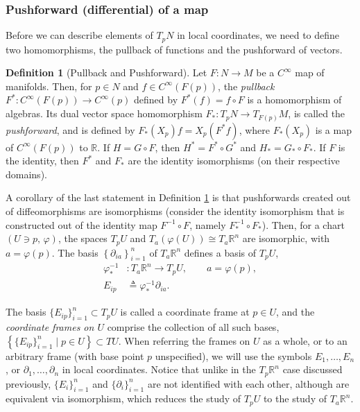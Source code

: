 \documentclass[psamsfonts]{amsart}
\theoremstyle{definition}
\newtheorem{defn}[thm]{Definition}
\theoremstyle{remark}
\newcommand*\R{\mathds{R}}
\numberwithin{equation}{section}
\begin{document}
\subsubsection{Pushforward (differential) of a map}
Before we can describe elements of $T_pN$ in local coordinates, we need to define two homomorphisms, the pullback of functions and the pushforward of vectors. 

\begin{defn}[Pullback and Pushforward]\label{def:pushforward}
Let $F:N\rightarrow M$ be a $C^{\infty}$ map of manifolds. Then, for $p\in N$ and $f\in C^{\infty}(F(p))$, the \textit{pullback} $F^*:C^{\infty}(F(p))\rightarrow C^{\infty}(p)$ defined by $F^*(f) = f\circ F$ is a homomorphism of algebras. Its dual vector space homomorphism $F_*:T_pN \rightarrow T_{F(p)}M$, is called the \textit{pushforward}, and is defined by $F_*(X_p)f = X_p(F^*f)$, where $F_*(X_p)$ is a map of $C^{\infty}(F(p))$ to $\R$. If $H = G\circ F$, then $H^* = F^* \circ G^*$ and $H_* = G_* \circ F_*$. If $F$ is the identity, then $F^*$ and $F_*$ are the identity isomorphisms (on their respective domains). 
\end{defn}

A corollary of the last statement in Definition \ref{def:pushforward} is that pushforwards created out of diffeomorphisms are isomorphisms (consider the identity isomorphism that is constructed out of the identity map $F^{-1}\circ F$, namely $F_*^{-1}\circ F_*$). Then, for a chart $(U\ni p,\, \varphi)$, the spaces $T_pU$ and $T_{a}\left(\varphi(U)\right) \cong T_{a}\R^n$ are isomorphic, with $a = \varphi(p)$. The basis $ \left\{\partial_{ia}\right\}_{i = 1}^n$ of $T_{a}\R^n$ defines a basis of $T_pU$, 
\begin{equation}
\begin{aligned}
\varphi^{-1}_*&:T_{a}\R^n\rightarrow T_pU, \qquad a = \varphi(p),\\
E_{ip} &\triangleq{} \varphi^{-1}_*\partial_{ia}.
\end{aligned}
\end{equation}


The basis $\{E_{ip}\}_{i=1}^n \subset T_pU$ is called a {coordinate frame} at $p\in U$, and the \textit{coordinate frames on $U$} comprise the collection of all such bases, $\left\{ \{E_{ip}\}_{i=1}^n \; \bigr| \;p\in U \right\} \subset TU$. When referring the frames on $U$ as a whole, or to an arbitrary frame (with base point $p$ unspecified), we will use the symbols $E_1, \dots, E_n$, or $\partial_1, \dots, \partial_n$ in local coordinates. Notice that unlike in the $T_p\R^n$ case discussed previously, $\{E_{i}\}_{i = 1}^n$ and $\{\partial_{i}\}_{i = 1}^n$ are not {identified} with each other, although are equivalent via isomorphism, which reduces the study of $T_pU$ to the study of $T_{a}\R^n$. 
\end{document}
